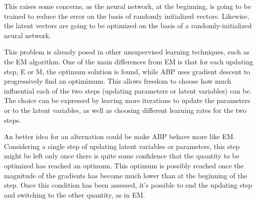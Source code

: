 This raises some concerns, as the neural network, at the beginning,
is going to be trained to reduce the error
on the basis of randomly
initialized vectors.
Likewise, the latent vectors are going to be optimized on the basis of a randomly-initialized neural network.

This problem is already posed in other unsupervised learning techniques, such as the EM algorithm. One of the main differences from EM is that for each updating step, E or M, the optimum
solution is found, while ABP uses gradient descent to progressively find an optimimum.
This allows freedom to choose how much influential each of the two steps (updating parameters
or latent variables) can be. The choice can be expressed by leaving more iterations to update
the parameters or to the latent variables, as well as choosing different learning rates for the two steps.

An better idea for an alternation could be make ABP behave more like EM.
Considering a single step of updating latent variables or parameters,
this step might be left only once there is quite some confidence
that the quantity to be optimized
has reached an optimum.
This optimum is possibly reached once the magnitude of the gradients has become much
lower than at the beginning of the step. Once this condition has been assessed,
it's possible to end the updating step and switching to the other quantity, as in EM.


